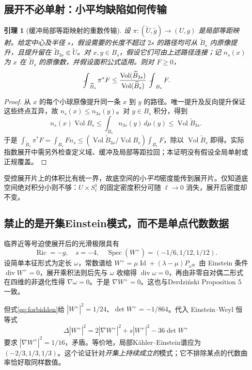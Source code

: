 \documentclass[UTF8,a4paper,11pt,fontset=fandol]{ctexart}
\numberwithin{equation}{section}
\newtheorem{lemma}[theorem]{引理}
\theoremstyle{definition}
\newcommand{\Ric}{\operatorname{Ric}}
\newcommand{\Vol}{\operatorname{Vol}}
\newcommand{\spec}{\operatorname{Spec}}
\newcommand{\Id}{\operatorname{Id}}
\newcommand{\fint}{\mathop{\rlap{\,\raisebox{0.1ex}{\tiny$-$}}\int}\nolimits}
\begin{document}
\subsection{展开不必单射：小平均缺陷如何传输}
\begin{lemma}[缓冲局部等距映射的重数传输]\label{lem:transport}
设 $\pi:(\widetilde U,\widetilde g)\to(U,g)$ 是局部等距映射。给定中心及半径 $s$，假设需要的长度不超过 $2s$ 的路径均可从 $\widetilde B_s$ 内原像提升，且提升留在 $\widetilde B_{3s}\Subset\widetilde U$。对 $x,y\in B_s$，假设它们可由上述路径连接；记 $n_s(x)$ 为 $x$ 在 $\widetilde B_s$ 的原像数，并假设面积公式适用。则对 $F\ge0$，
\begin{equation}\label{eq:transport}
\fint_{\widetilde B_s}\pi^*F\le
\frac{\Vol(\widetilde B_{3s})}{\Vol(\widetilde B_s)}\fint_{B_s}F.
\end{equation}
\end{lemma}
\begin{proof}
从 $x$ 的每个小球原像提升同一条 $x$ 到 $y$ 的路径。唯一提升及反向提升保证这些终点互异，故 $n_s(x)\le n_{3s}(y)$。对 $y\in B_s$ 积分，得到
\[
n_s(x)\Vol B_s\le\int_{B_s}n_{3s}(y)\,d\mu(y)\le\Vol\widetilde B_{3s}.
\]
于是 $\int_{\widetilde B_s}\pi^*F=\int_{B_s}F n_s\le(\Vol\widetilde B_{3s}/\Vol B_s)\int_{B_s}F$，除以 $\Vol\widetilde B_s$ 即得。实际指数展开中需另外检查定义域、缓冲及局部等距拉回；本证明没有假设全局单射或正规覆盖。
\end{proof}

受控展开片上的体积比有统一界，故底空间的小\emph{平均}密度能传到展开片。仅知道底空间绝对积分小则不够：$U\times S^1_\ell$ 的固定密度积分可随 $\ell\to0$ 消失，展开后密度却不变。

\subsection{禁止的是开集Einstein模式，而不是单点代数数据}
临界近等号迫使展开后的光滑极限具有
\begin{equation}\label{eq:forbidden}
\Ric=-g,\quad s=-4,\quad
\spec(W^+)=(-1/6,1/12,1/12).
\end{equation}
设简单本征形式为定长 $\omega$，常数谱给 $W^+=\mu\Id+(\lambda-\mu)P_\omega$。由 Einstein 条件 $\operatorname{div}W^+=0$，展开乘积法则后先与 $\omega$ 收缩得 $\operatorname{div}\omega=0$，再由非零自对偶二形式在四维的非退化性得 $\nabla\omega=0$。于是 $\nabla W^+=0$。这也与Derdzi\'nski Proposition 5一致\cite{Derdzinski}。

但式\eqref{eq:forbidden}给 $|W^+|^2=1/24$、$\det W^+=-1/864$。代入 Einstein--Weyl 恒等式
\[
\Delta|W^+|^2=2|\nabla W^+|^2+s|W^+|^2-36\det W^+
\]
要求 $|\nabla W^+|^2=1/16$，矛盾。等价地，局部K\"ahler--Einstein谱应为 $(-2/3,1/3,1/3)$。这个论证针对\emph{开集上持续成立的}模式；它不排除某点的代数曲率恰好取同样数值。
\end{document}
